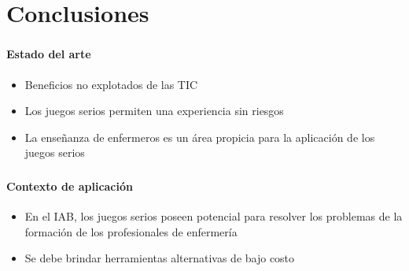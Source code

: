 \section{Conclusiones}
\setcounter{sectiontotal}{7}

\begin{frame}
\frametitle{\pagetitle}
\framesubtitle{Estado del arte}
\begin{itemize}[<+->]

\item Beneficios no explotados de las TIC


\item Los juegos serios permiten una experiencia sin riesgos


\item La enseñanza de enfermeros es un área propicia para la
aplicación de los juegos serios

\end{itemize}
\end{frame}

\begin{frame}
\frametitle{\pagetitle}
\framesubtitle{Contexto de aplicación}
\begin{itemize}[<+->]
\item En el IAB, los juegos serios poseen potencial para resolver los problemas de la formación de los profesionales de enfermería

\item Se debe brindar herramientas alternativas de bajo costo
\end{itemize}
\end{frame}

